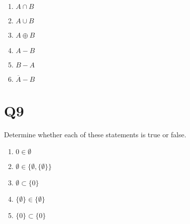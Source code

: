 \documentclass[12pt]{exam}
\begin{document}
\begin{enumerate}
    \item $A \cap B$
    \item $A \cup B$
    \item $A \oplus B$
    \item $A - B$
    \item $B - A$
    \item $\overline{A} - B$
\end{enumerate}


\section{Q9}
Determine whether each of these statements is true or false.
\begin{enumerate}
    \item \(0 \in \emptyset\)
    \item \(\emptyset \in \{\emptyset, \{\emptyset\}\}\)
    \item \(\emptyset \subset \{0\}\)
    \item \(\{\emptyset\} \in \{\emptyset\}\)
    \item \(\{0\} \subset \{0\}\)
\end{enumerate}
\end{document}
